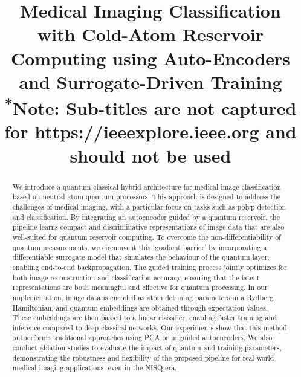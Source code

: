 \documentclass[conference]{IEEEtran}
\begin{document}
\title{Medical Imaging Classification with Cold-Atom Reservoir Computing using Auto-Encoders and Surrogate-Driven Training\\
{\footnotesize \textsuperscript{*}Note: Sub-titles are not captured for https://ieeexplore.ieee.org  and
should not be used}
}

\author{

\and
{}
}

\maketitle


\begin{abstract}
We introduce a quantum-classical hybrid 
architecture for medical image classification 
based on neutral atom quantum processors. 
This approach is designed to address the challenges of 
medical imaging, with a particular focus on tasks such 
as polyp detection and classification.
By integrating an autoencoder guided by a quantum 
reservoir, the pipeline learns compact and discriminative 
representations of image data that are also well-suited for quantum reservoir 
computing. To overcome the non-differentiability of quantum 
measurements, we circumvent this `gradient barrier' 
by incorporating a differentiable surrogate model that simulates the 
behaviour of the quantum layer, enabling end-to-end backpropagation. 
The guided training process jointly optimizes for both image 
reconstruction and classification accuracy, ensuring that the latent 
representations are both meaningful and effective for quantum processing. 
In our implementation, image data is encoded as atom detuning parameters 
in a Rydberg Hamiltonian, and quantum embeddings are obtained through expectation 
values. These embeddings are then passed to a linear classifier, 
enabling faster training and inference compared to deep classical networks.
Our experiments show that this method outperforms traditional 
approaches using PCA or unguided autoencoders. We also conduct 
ablation studies to evaluate the impact of quantum and training 
parameters, demonstrating the robustness and flexibility of the 
proposed pipeline for real-world medical imaging applications, 
even in the NISQ era.
\end{abstract}
\end{document}
